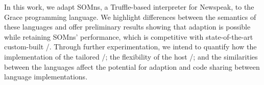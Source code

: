 

%
%
%

% 
%


In this work, we adapt SOMns, a Truffle-based interpreter for Newspeak, to the Grace programming language. We highlight differences between the semantics of these languages and offer preliminary results showing that adaption is possible while retaining SOMns' performance, which is competitive with state-of-the-art custom-built \vms/. Through further experimentation, we intend to quantify how the implementation of the tailored \vm/; the flexibility of the host \vm/; and the similarities between the languages affect the potential for adaption and code sharing between language implementations.

